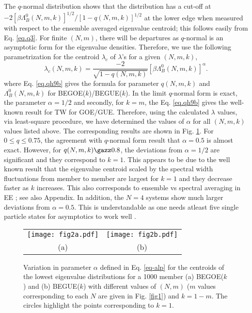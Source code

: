 The $q$-normal distribution shows that the distribution has a cut-off at $-2 [\beta \Lambda_B^{0}(N,m,k)]^{1/2}/[1-q(N,m,k)]^{1/2}$ at the lower edge when measured with respect to the ensemble averaged eigenvalue centroid; this follows easily from Eq. \eqref{eq.q3}.  For finite $(N,m)$, there will be departures as $q$-normal is an asymptotic form for the eigenvalue densities. Therefore, we use the following parametrization for the centroid $\lambda_c$ of $\lambda$'s for a given $(N,m,k)$,
\begin{equation}
\lambda_c(N,m,k)  = \displaystyle\frac{-2}{\displaystyle\sqrt{1- q(N,m,k)}}{\left[ \beta \Lambda_B^{0}(N,m,k) \right]}^{\alpha}.
\label{eq-alp}
\end{equation}
where Eq. \eqref{eq.qh9b} gives the formula for parameter $q(N,m,k)$ and $\Lambda_B^{0}(N,m,k)$ for BEGOE($k$)/BEGUE($k$).  In the limit $q$-normal form is exact, the parameter $\alpha = 1/2$ and secondly, for $k = m$, the Eq. \eqref{eq.qh9b} gives the well-known result for TW for GOE/GUE. Therefore, using the calculated $\lambda$ values, via least-square procedure, we have determined the values of $\alpha$ for all $(N,m,k)$ values listed above.  The corresponding results are shown in Fig. \ref{fig2}. For $0 \leq q \leq 0.75$, the agreement with $q$-normal form result that $\alpha = 0.5$ is almost exact. However,  for $q(N,m,k) \gazz 0.8$, the deviations from $\alpha = 1/2$ are significant and they correspond to $k = 1$.  This appears to be due to the well known result that the eigenvalue centroid scaled by the spectral width fluctuations from member to member are largest for $k =1$ \cite{Chavda2003} and they decrease faster as $k$ increases. This also corresponds to ensemble vs spectral averaging in EE \cite{Brody, SeligmanFlores}; see also Appendix. In addition, the $N = 4$ systems show much larger deviations from $\alpha = 0.5$. This is understandable as one needs atleast five single particle states for asymptotics to work well \cite{KPat-2000-PLA}.  

\begin{figure}[tbh]
	\begin{center}
		\begin{tabular}{cc}
			\texttt{[image: fig2a.pdf]}&\texttt{[image: fig2b.pdf]}\\
			(a) &(b)
		\end{tabular}
	\end{center}
	\caption{Variation in parameter $\alpha$ defined in Eq. \eqref{eq-alp} for the centroids of the lowest eigenvalue distributions for a 1000 member (a) BEGOE($k$) and (b) BEGUE($k$) with different values of $(N,m)$ ($m$ values corresponding to each $N$ are given in Fig. \ref{fig1}) and $k = 1-m$.  The circles highlight the points corresponding to $k = 1$. }
	\label{fig2}
\end{figure}

